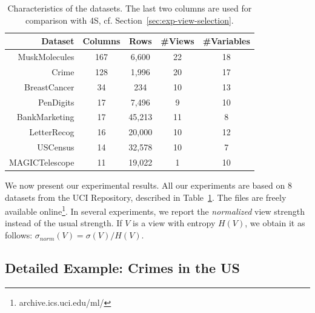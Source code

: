 \begin{table}
    \centering
    \small
    \begin{tabular}{r c c c c} 
        \hline
        Dataset & Columns & Rows & \#Views & \#Variables\\
        \hline
        MuskMolecules & 167 & 6,600 & 22 & 18\\
        Crime & 128 & 1,996 & 20 & 17\\
        BreastCancer & 34 & 234 & 10 & 13\\
        PenDigits & 17 & 7,496 & 9 & 10\\
        BankMarketing & 17 & 45,213 & 11& 8\\
        LetterRecog & 16 & 20,000 & 10 & 12\\
        USCensus & 14 & 32,578 & 10 & 7\\
        MAGICTelescope & 11 & 19,022 & 1 & 10\\
        \hline
    \end{tabular}
    \caption{Characteristics of the datasets. The last two columns are used for
    comparison with 4S, cf. Section~\ref{sec:exp-view-selection}.}
    \label{tab:datasets}
\end{table}
We now present our experimental results. All our experiments are based on 8
datasets from the UCI Repository, described in Table~\ref{tab:datasets}. The
files are freely available online\footnote{archive.ics.uci.edu/ml/}. In several
experiments, we report the \emph{normalized} view strength instead of the usual
strength. If $V$ is a view with entropy $H(V)$, we obtain it as follows:
$\sigma_{norm}(V) = \sigma(V) / H(V)$.

\subsection{Detailed Example: Crimes in the US}
\label{sec:crime}

